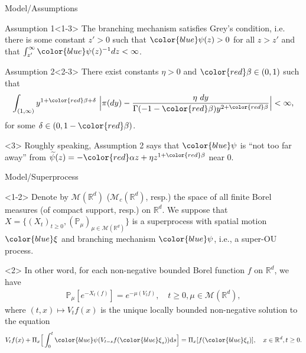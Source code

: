 \documentclass[xcolor=dvipsnames]{beamer}
\begin{document}
\begin{frame}{Model/Assumptions}
\begin{block}{Assumption 1}<1-3>
	The branching mechanism satisfies Grey's condition, i.e. there is some constant $z' > 0$ such that ${\color{blue}\psi}(z) > 0$ for all $z>z'$ and that $\int_{z'}^\infty {\color{blue}\psi}(z)^{-1}dz < \infty$.
\end{block}
\begin{block}{Assumption 2}<2-3>
There exist constants $\eta > 0$ and ${\color{red}\beta} \in (0,1)$ such that
$$
    \int_{(1,\infty)}y^{1+ {\color{red} \beta} +\delta}~\Big|\pi(dy)-\frac{\eta~dy}{\Gamma(-1-{\color{red}\beta})y^{2+{\color{red}\beta}}}\Big| <\infty,
$$
	for some $\delta \in (0, 1-{\color{red}\beta})$.
\end{block}
\begin{block}{}<3>
Roughly speaking, Assumption 2 says that ${\color{blue}\psi}$ is ``not too far away'' from
$\widetilde \psi(z)= -{\color{red}\alpha} z+\eta z^{1+{\color{red}\beta}}$ near 0.
\end{block}
\end{frame}

\begin{frame}{Model/Superprocess}
\begin{block}{}<1-2>
Denote by $\mathcal M(\mathbb R^d)$ ($\mathcal M_c(\mathbb R^d)$, resp.) the space of all finite Borel measures (of compact support, resp.) on $\mathbb R^d$. We suppose that $X=\{(X_t)_{t\ge 0}, 
(\mathbb P_\mu)_{\mu \in \mathcal M(\mathbb R^d)}\}$ is a superprocess with spatial motion ${\color{blue}\xi}$ and branching mechanism ${\color{blue}\psi}$, i.e., a super-OU process.
\end{block}
\begin{block}{}<2>
	In other word, for each non-negative bounded Borel function $f$ on $\mathbb R^d$, we have
	\begin{align}
		\label{eq: def of V_t}
		\mathbb{P}_{\mu}[e^{-X_t(f)}]
		= e^{-\mu(V_tf)},
		\quad t\geq 0, \mu \in \mathcal M(\mathbb R^d),
	\end{align}
	where $(t,x) \mapsto V_tf(x)$ is the unique locally bounded non-negative solution to the equation
	\begin{align}
		V_tf(x) + \Pi_x \Big[ \int_0^t {\color{blue}\psi} (V_{t-s}f({\color{blue}\xi}_s) ) \mathrm ds\Big]
		= \Pi_x [f({\color{blue}\xi}_t)],
		\quad x\in \mathbb R^d, t\geq 0.
	\end{align}	
\end{block}
\end{frame}
\end{document}
